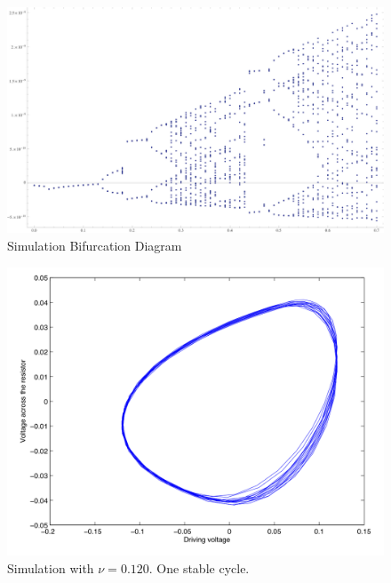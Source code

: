 \documentclass[12pt]{report}
\begin{document}
	\begin{figure}[h]
		\centering
		\includegraphics{simulations/circuit.png}
		\caption{Simulation Bifurcation Diagram}
		\label{fig: Simulation Bifurcation Diagram}
	\end{figure}



	\begin{figure}
		\centering
		\includegraphics{simulations/plotnu0120.png}
		\caption{Simulation with $\nu=0.120$. One stable cycle.}
		\label{fig:sim.0120}
	\end{figure}
	
\end{document}
